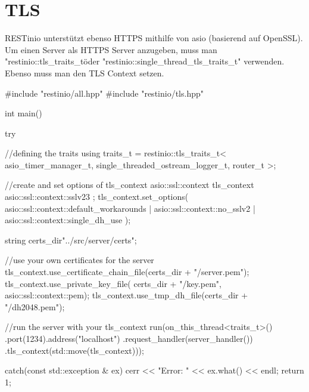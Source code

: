 \documentclass[german,oneside,color]{htldipl}
\begin{document}
\newpage
\section{TLS}
RESTinio unterstützt ebenso HTTPS mithilfe von asio (basierend auf OpenSSL). Um einen Server als HTTPS Server anzugeben, muss man "restinio::tls\_traits\_t\" oder "restinio::single\_thread\_tls\_traits\_t" verwenden. Ebenso muss man den TLS Context setzen. 
\begin{program}[H]
\begin{JavaCode}
#include "restinio/all.hpp"
#include "restinio/tls.hpp"

int main() {
    try {
        //defining the traits
        using traits_t =
            restinio::tls_traits_t<
                asio_timer_manager_t,
                single_threaded_ostream_logger_t,
                router_t >;
				
        //create and set options of tls\_context
        asio::ssl::context tls_context{ asio::ssl::context::sslv23 };
        tls_context.set_options(
        asio::ssl::context::default_workarounds |
        asio::ssl::context::no_sslv2 |
        asio::ssl::context::single_dh_use );

        string certs_dir{"../src/server/certs"};

        //use your own certificates for the server
        tls_context.use_certificate_chain_file(certs_dir + "/server.pem");
        tls_context.use_private_key_file(
            certs_dir + "/key.pem",
            asio::ssl::context::pem);
        tls_context.use_tmp_dh_file(certs_dir + "/dh2048.pem");

        //run the server with your tls\_context
        run(on_this_thread<traits_t>()
            .port(1234).address("localhost")
            .request_handler(server_handler())
            .tls_context(std::move(tls_context)));
    } catch(const std::exception & ex) {
        cerr << "Error: " << ex.what() << endl;
        return 1;
    }
}
\end{JavaCode}
\end{program}
\end{document}
